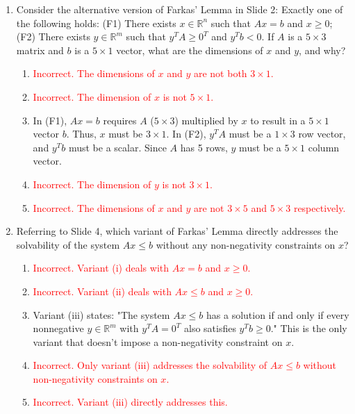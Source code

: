 \documentclass{article}%
\newcommand{\incorrect}[1]{\textcolor{red}{#1}}
\begin{document}
\begin{enumerate}
\begin{enumerate}
\begin{enumerate}
\end{enumerate}%
\vspace{0.5em}%
\item Consider the alternative version of Farkas' Lemma in Slide 2:  Exactly one of the following holds: (F1) There exists $x \in \mathbb{R}^n$ such that $Ax = b$ and $x \ge 0$; (F2) There exists $y \in \mathbb{R}^m$ such that $y^T A \ge 0^T$ and $y^T b < 0$. If $A$ is a $5 \times 3$ matrix and $b$ is a $5 \times 1$ vector, what are the dimensions of $x$ and $y$, and why?%
\begin{enumerate}%
\item \incorrect{Incorrect. The dimensions of $x$ and $y$ are not both $3 \times 1$.}%
\item \incorrect{Incorrect. The dimension of $x$ is not $5 \times 1$.}%
\item In (F1), $Ax = b$ requires $A$ ($5 \times 3$) multiplied by $x$ to result in a $5 \times 1$ vector $b$. Thus, $x$ must be $3 \times 1$. In (F2), $y^T A$ must be a $1 \times 3$ row vector, and $y^T b$ must be a scalar. Since $A$ has 5 rows, $y$ must be a $5 \times 1$ column vector.%
\item \incorrect{Incorrect. The dimension of $y$ is not $3 \times 1$.}%
\item \incorrect{Incorrect. The dimensions of $x$ and $y$ are not $3 \times 5$ and $5 \times 3$ respectively.}%
\end{enumerate}%
\vspace{0.5em}%
\item Referring to Slide 4, which variant of Farkas' Lemma directly addresses the solvability of the system $Ax \le b$ without any non-negativity constraints on $x$?%
\begin{enumerate}%
\item \incorrect{Incorrect. Variant (i) deals with $Ax = b$ and $x \ge 0$.}%
\item \incorrect{Incorrect. Variant (ii) deals with $Ax \le b$ and $x \ge 0$.}%
\item Variant (iii) states: "The system $Ax \le b$ has a solution if and only if every nonnegative $y \in \mathbb{R}^m$ with $y^T A = 0^T$ also satisfies $y^T b \ge 0$."  This is the only variant that doesn't impose a non-negativity constraint on $x$.%
\item \incorrect{Incorrect. Only variant (iii) addresses the solvability of $Ax \le b$ without non-negativity constraints on $x$.}%
\item \incorrect{Incorrect. Variant (iii) directly addresses this.}%
\end{enumerate}%
\vspace{0.5em}%
\end{enumerate}%
\end{enumerate}

%
\end{document}
